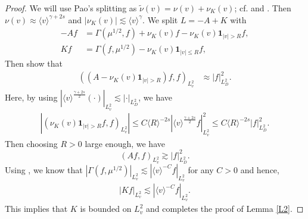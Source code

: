 \documentclass[reqno,a4paper]{amsart}
\numberwithin{equation}{section}
\newcommand{\1}{\mathbf{1}}
\newcommand{\<}{\langle}
\renewcommand{\>}{\rangle}
\begin{document}
\begin{proof}
\medskip{} 
We will use Pao's splitting as $\tilde{{\nu}}(v)={\nu}(v)+{\nu}_K(v)$; cf. \cite[p.568 eq. (65), (66)]{Pao1974} and \cite{Gressman2011}. Then $\nu(v)\approx\<v\>^{\gamma+2s}$ and $|{\nu}_K(v)|\lesssim \<v\>^\gamma$. We split $L=-A+K$ with 
\begin{equation}\label{AK}
	\begin{aligned}
		-Af &= \Gamma(\mu^{1/2},f)+{\nu}_K(v)f-\nu_K(v)\1_{|v|> R}f,\\
		Kf &= \Gamma(f,\mu^{1/2})-\nu_K(v)\1_{|v|\le R}f,
	\end{aligned}
\end{equation}
Then \cite[Lemma 2.4 and Lemma 2.5]{Gressman2011} show that 
\begin{align*}
	((A-\nu_K(v)\1_{|v|> R})f,f)_{L^2_v}&\approx |f|^2_{L^2_D}.
\end{align*}
Here, by using $|\<v\>^{\frac{\gamma+2s}{2}}(\cdot)|_{L^2_v}\lesssim |\cdot|_{L^2_D}$, we have 
\begin{align*}
	|(\nu_K(v)\1_{|v|> R}f,f)_{L^2_v}|\le C\<R\>^{-2s}|\<v\>^{\frac{\gamma+2s}{2}}f|_{L^2_v}^2\le C\<R\>^{-2s}|f|_{L^2_D}^2. 
\end{align*}
Then choosing $R>0$ large enough, we have 
\begin{equation*}
	(Af,f)_{L^2_v}\gtrsim |f|^2_{L^2_D}.
\end{equation*}
Using \cite[Lemma 2.1]{Global2019}, we know that $|\Gamma(f,\mu^{1/2})|_{L^2_v}\lesssim |\<v\>^{-C}f|_{L^2_v}$ for any $C>0$ and hence, 
\begin{align*}
	|Kf|_{L^2_v}\lesssim |\<v\>^{-C}f|_{L^2_v}. 
\end{align*}
This implies that $K$ is bounded on $L^2_v$ and completes the proof of Lemma \ref{L2}. 
\end{proof}
\end{document}
